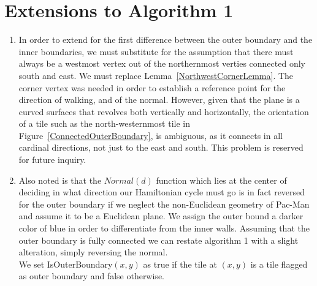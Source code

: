 \section{Extensions to Algorithm 1}
\begin{enumerate}
\item In order to extend for the first difference between the outer boundary and the inner boundaries, we must substitute for the assumption that there must always be a westmost vertex out of the northernmost verties connected only south and east. We must replace Lemma~\ref{NorthwestCornerLemma}. The corner vertex was needed in order to establish a reference point for the direction of walking, and of the normal. However, given that the plane is a curved surfaces that revolves both vertically and horizontally, the orientation of a tile such as the north-westernmost tile in Figure~\ref{ConnectedOuterBoundary}, is ambiguous, as it connects in all cardinal directions, not just to the east and south. This problem is reserved for future inquiry. 

\item Also noted is that the $Normal(d)$ function which lies at the center of deciding in what direction our Hamiltonian cycle must go is in fact reversed for the outer boundary if we neglect the non-Euclidean geometry of Pac-Man and assume it to be a Euclidean plane. We assign the outer bound a darker color of blue in order to differentiate from the inner walls. Assuming that the outer boundary is fully connected we can restate algorithm 1 with a slight alteration, simply reversing the normal.
\\We set IsOuterBoundary$(x,y)$ as true if the tile at $(x,y)$ is a tile flagged as outer boundary and false otherwise.

\end{enumerate}
